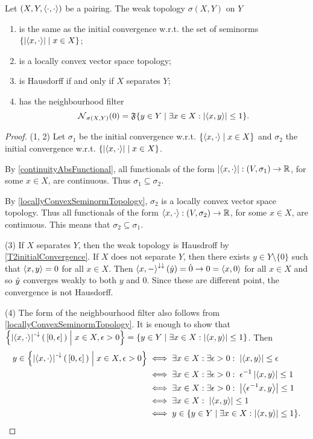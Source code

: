 \begin{lemma} \label{weakTopologyLCTVS}
Let $\sSet{X,Y,\pair{\cdot,\cdot}}$ be a pairing. The weak topology $\sigma(X,Y)$ on $Y$ 
\begin{enumerate}
\item is the same as the initial convergence w.r.t. the set of seminorms $\setbuilder{\abspair{x,\cdot}}{x\in X}$;
\item is a locally convex vector space topology;
\item is Hausdorff \textup{if and only if} $X$ separates $Y$;
\item has the neighbourhood filter
\[ \neighbourhood_{\sigma(X,Y)}(0) = \mathfrak{F}\setbuilder{y\in Y}{\exists x\in X: \abspair{x,y} \leq 1}. \]
\end{enumerate}
\end{lemma}
\begin{proof}
(1, 2) Let $\sigma_1$ be the initial convergence w.r.t. $\setbuilder{\pair{x,\cdot}}{x\in X}$ and $\sigma_2$ the initial convergence w.r.t. $\setbuilder{\abspair{x,\cdot}}{x\in X}$.

By \ref{continuityAbsFunctional}, all functionals of the form $\abspair{x,\cdot}: \sSet{V,\sigma_1} \to \R$, for some $x\in X$, are continuous. Thus $\sigma_1 \subseteq \sigma_2$.

By \ref{locallyConvexSeminormTopology}, $\sigma_2$ is a locally convex vector space topology. Thus all functionals of the form $\pair{x,\cdot}: \sSet{V,\sigma_2} \to \R$, for some $x\in X$, are continuous. This means that $\sigma_2 \subseteq \sigma_1$.

(3) If $X$ separates $Y$, then the weak topology is Hausdroff by \ref{T2initialConvergence}. If $X$ does not separate $Y$, then there exists $y\in Y\setminus\{0\}$ such that $\left\langle x,y \right\rangle = 0$ for all $x\in X$. Then $\left\langle x,- \right\rangle^{\downarrow\downarrow}(\dot{y}) = \dot{0} \to 0 = \left\langle x,0 \right\rangle$ for all $x\in X$ and so $\dot{y}$ converges weakly to both $y$ and $0$. Since these are different point, the convergence is not Hausdorff.

(4) The form of the neighbourhood filter also follows from \ref{locallyConvexSeminormTopology}. It is enough to show that $\setbuilder{\abspair{x,\cdot}^{\preimf}(\,[0,\epsilon]\,)}{x\in X, \epsilon > 0} = \setbuilder{y\in Y}{\exists x\in X: \abspair{x,y} \leq 1}$. Then
\begin{align*}
y \in \setbuilder{\abspair{x,\cdot}^{\preimf}(\,[0,\epsilon]\,)}{x\in X, \epsilon > 0} &\iff \exists x\in X: \exists \epsilon > 0: \; \abspair{x,y} \leq \epsilon \\
&\iff \exists x\in X: \exists \epsilon > 0: \; \epsilon^{-1}\abspair{x,y} \leq 1 \\
&\iff \exists x\in X: \exists \epsilon > 0: \; \abspair{\epsilon^{-1}x,y} \leq 1 \\
&\iff \exists x\in X: \; \abspair{x,y} \leq 1 \\
&\iff y\in \setbuilder{y\in Y}{\exists x\in X: \abspair{x,y} \leq 1}.
\end{align*}
\end{proof}

